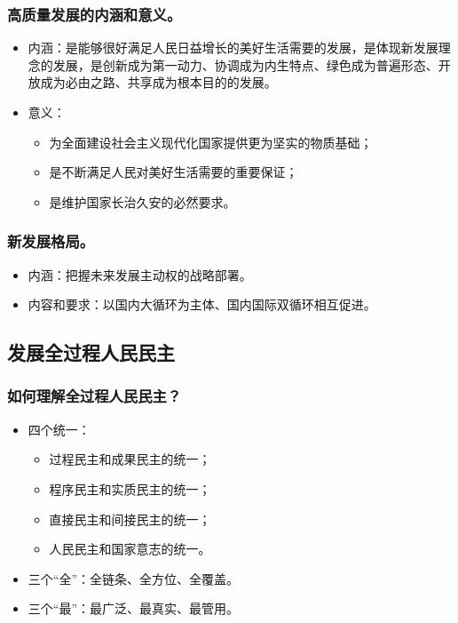 \documentclass{article}
\begin{document}
\subsubsection{高质量发展的内涵和意义。}
\begin{itemize}
    \item 内涵：是能够很好满足人民日益增长的美好生活需要的发展，是体现新发展理念的发展，是创新成为第一动力、协调成为内生特点、绿色成为普遍形态、开放成为必由之路、共享成为根本目的的发展。
    \item 意义：
    \begin{itemize}
        \item 为全面建设社会主义现代化国家提供更为坚实的物质基础；
        \item 是不断满足人民对美好生活需要的重要保证；
        \item 是维护国家长治久安的必然要求。
    \end{itemize}
\end{itemize}

\subsubsection{新发展格局。}
\begin{itemize}
    \item 内涵：把握未来发展主动权的战略部署。
    \item 内容和要求：以国内大循环为主体、国内国际双循环相互促进。
\end{itemize}

\subsection{发展全过程人民民主}

\subsubsection{如何理解全过程人民民主？}
\begin{itemize}
    \item 四个统一：
    \begin{itemize}
        \item 过程民主和成果民主的统一；
        \item 程序民主和实质民主的统一；
        \item 直接民主和间接民主的统一；
        \item 人民民主和国家意志的统一。
    \end{itemize}
    \item 三个“全”：全链条、全方位、全覆盖。
    \item 三个“最”：最广泛、最真实、最管用。
\end{itemize}
\end{document}
